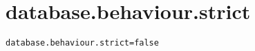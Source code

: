 \section{database.behaviour.strict}
\label{configuration:DatabaseBehaviourStrict}
\ClearAPI
\TODO
{}
\begin{lstlisting}[style=Props,caption={Usage example for \textit{database.behaviour.strict}}]
database.behaviour.strict=false
\end{lstlisting}